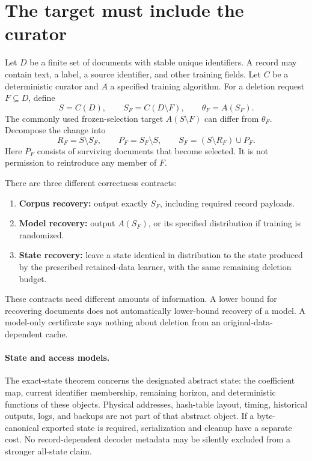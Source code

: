 \documentclass[11pt,a4paper]{article}
\theoremstyle{definition}\newtheorem{definition}[theorem]{Definition}
\newcommand{\minus}{\setminus}
\begin{document}
\newpage
\begingroup
\small\setlength{\parskip}{0pt}
\tableofcontents
\endgroup
\newpage

\section{The target must include the curator}
Let $D$ be a finite set of documents with stable unique identifiers. A record may contain text, a label, a source identifier, and other training fields. Let $C$ be a deterministic curator and $A$ a specified training algorithm. For a deletion request $F\subseteq D$, define
\begin{equation}
 S=C(D),\qquad S_F=C(D\minus F),\qquad \theta_F=A(S_F).
\end{equation}
The commonly used frozen-selection target $A(S\minus F)$ can differ from $\theta_F$. Decompose the change into
\begin{equation}
 R_F=S\minus S_F,\qquad P_F=S_F\minus S,\qquad
 S_F=(S\minus R_F)\cup P_F.
\end{equation}
Here $P_F$ consists of surviving documents that become selected. It is not permission to reintroduce any member of $F$.

There are three different correctness contracts:
\begin{enumerate}
\item \textbf{Corpus recovery:} output exactly $S_F$, including required record payloads.
\item \textbf{Model recovery:} output $A(S_F)$, or its specified distribution if training is randomized.
\item \textbf{State recovery:} leave a state identical in distribution to the state produced by the prescribed retained-data learner, with the same remaining deletion budget.
\end{enumerate}
These contracts need different amounts of information. A lower bound for recovering documents does not automatically lower-bound recovery of a model. A model-only certificate says nothing about deletion from an original-data-dependent cache.

\paragraph{State and access models.} The exact-state theorem concerns the designated abstract state: the coefficient map, current identifier membership, remaining horizon, and deterministic functions of these objects. Physical addresses, hash-table layout, timing, historical outputs, logs, and backups are not part of that abstract object. If a byte-canonical exported state is required, serialization and cleanup have a separate cost. No record-dependent decoder metadata may be silently excluded from a stronger all-state claim.
\end{document}
